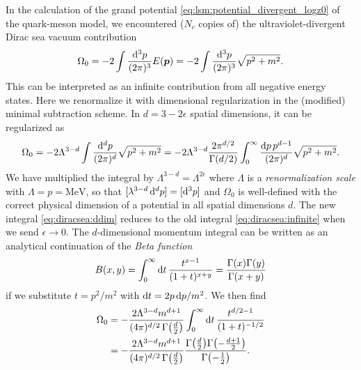 In the calculation of the grand potential \eqref{eq:lsm:potential_divergent_logz0} of the quark-meson model,
we encountered ($N_c$ copies of) the ultraviolet-divergent Dirac sea vacuum contribution %
\begin{equation}
	\Omega_0 = -2 \int \frac{\mathop{}\!\mathrm{d}^3 p}{(2 \pi)^3} E({\bm{p}})
	         = -2 \int \frac{\mathop{}\!\mathrm{d}^3 p}{(2 \pi)^3} \sqrt{p^2+m^2}.
\label{eq:diracsea:infinite}
\end{equation}
This can be interpreted as an infinite contribution from all negative energy states.
Here we renormalize it with dimensional regularization in the (modified) minimal subtraction scheme.
In $d = 3 - 2 \epsilon$ spatial dimensions, it can be regularized as
\begin{equation}
	\Omega_0 = -2 \Lambda^{3-d} \int \frac{\mathop{}\!\mathrm{d}^d p}{(2 \pi)^d} \sqrt{p^2 + m^2}
	         = -2 \Lambda^{3-d} \frac{2 \pi^{d/2}}{\Gamma(d/2)} \int_0^\infty \frac{\mathop{}\!\mathrm{d} p \, p^{d-1}}{(2 \pi)^d} \sqrt{p^2 + m^2} .
\label{eq:diracsea:ddim}
\end{equation}
We have multiplied the integral by $\Lambda^{3-d} = \Lambda^{2\epsilon}$ where $\Lambda$ is a \emph{renormalization scale} with $\unit{\Lambda} = \unit{p} = \si{\mega\electronvolt}$,
so that $[\lambda^{3-d} \mathop{}\!\mathrm{d}^d p] = [\mathop{}\!\mathrm{d}^3 p]$ and $\Omega_0$ is well-defined with the correct physical dimension of a potential in all spatial dimensions $d$.
The new integral \eqref{eq:diracsea:ddim} reduces to the old integral \eqref{eq:diracsea:infinite} when we send $\epsilon \rightarrow 0$.
The $d$-dimensional momentum integral can be written as an analytical continuation of the \emph{Beta function} \cite{ref:beta_function}
\begin{equation}
	B(x,y) = \int_0^\infty \mathop{}\!\mathrm{d} t \, \frac{t^{x-1}}{(1+t)^{x+y}} = \frac{\Gamma(x) \Gamma(y)}{\Gamma(x+y)}
\end{equation}
if we substitute $t = p^2/m^2$ with $\mathop{}\!\mathrm{d} t = 2 p \mathop{}\!\mathrm{d} p / m^2$.
We then find
\begin{equation}
\begin{split}
	\Omega_0 &= -\frac{2\Lambda^{3-d} m^{d+1}}{(4 \pi)^{d/2}\,\Gamma\big(\frac{d}{2}\big)} \int_0^\infty \mathop{}\!\mathrm{d} t \, \frac{t^{d/2-1}}{(1+t)^{-1/2}} \\
	         &= -\frac{2\Lambda^{3-d} m^{d+1}}{(4 \pi)^{d/2}\,\Gamma\big(\frac{d}{2}\big)} \frac{\Gamma\big(\frac{d}{2}\big) \Gamma\big( \textstyle{-\frac{d+1}{2}} \big)}{\Gamma\big( \textstyle{-\frac{1}{2}} \big)} .
\end{split}
\end{equation}
